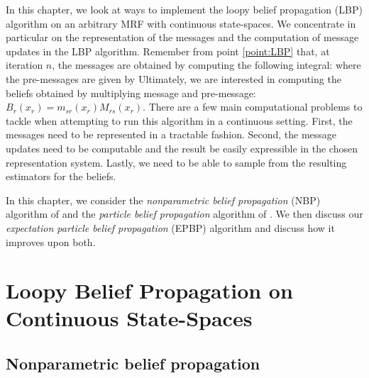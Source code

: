 
In this chapter, we look at ways to implement the loopy belief propagation (LBP) algorithm on an arbitrary MRF with continuous state-spaces. We concentrate in particular on the representation of the messages and the computation of message updates in the LBP algorithm. Remember from point \ref{point:LBP} that, at iteration $n$, the messages are obtained by computing the following integral:
where the pre-messages are given by 
Ultimately, we are interested in computing the beliefs obtained by multiplying message and pre-message: $B_{r}(x_{r}) = m_{sr}(x_{r})M_{rs}(x_{r})$. There are a few main computational problems to tackle when attempting to run this algorithm in a continuous setting. First, the messages need to be represented in a tractable fashion. Second, the message updates need to be computable and the result be easily expressible in the chosen representation system. Lastly, we need to be able to sample from the resulting estimators for the beliefs. 

In this chapter, we consider the \emph{nonparametric belief propagation} (NBP) algorithm of \citet{sudderth03} and the \emph{particle belief propagation} algorithm of \citet{ihler09}. We then discuss our \emph{expectation particle belief propagation} (EPBP) algorithm \citep{lienart15} and discuss how it improves upon both. 

\section{Loopy Belief Propagation on Continuous State-Spaces}

\subsection{Nonparametric belief propagation}

